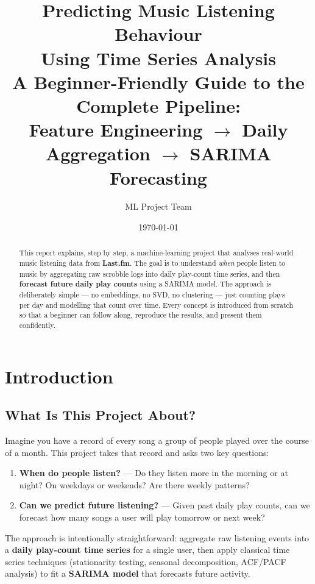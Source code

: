 \documentclass[12pt, a4paper]{article}
\title{
    \vspace{-1cm}
    \textbf{Predicting Music Listening Behaviour\\Using Time Series Analysis}\\[0.5em]
    \large A Beginner-Friendly Guide to the Complete Pipeline:\\
    Feature Engineering $\rightarrow$ Daily Aggregation $\rightarrow$ SARIMA Forecasting
}
\author{ML Project Team}
\date{\today}
\begin{document}
\maketitle
\thispagestyle{fancy}

\begin{abstract}
This report explains, step by step, a machine-learning project that analyses
real-world music listening data from \textbf{Last.fm}. The goal is to
understand \emph{when} people listen to music by aggregating raw scrobble
logs into daily play-count time series, and then \textbf{forecast future
daily play counts} using a SARIMA model. The approach is deliberately simple
--- no embeddings, no SVD, no clustering --- just counting plays per day and
modelling that count over time. Every concept is introduced from scratch so
that a beginner can follow along, reproduce the results, and present them
confidently.
\end{abstract}

\tableofcontents
\newpage

\section{Introduction}

\subsection{What Is This Project About?}
Imagine you have a record of every song a group of people played over the
course of a month. This project takes that record and asks two key questions:

\begin{enumerate}
    \item \textbf{When do people listen?} — Do they listen more in the
          morning or at night? On weekdays or weekends? Are there weekly
          patterns?
    \item \textbf{Can we predict future listening?} — Given past daily play
          counts, can we forecast how many songs a user will play tomorrow or
          next week?
\end{enumerate}

The approach is intentionally straightforward: aggregate raw listening events
into a \textbf{daily play-count time series} for a single user, then apply
classical time series techniques (stationarity testing, seasonal
decomposition, ACF/PACF analysis) to fit a \textbf{SARIMA model} that
forecasts future activity.
\end{document}
